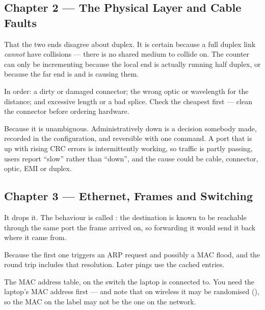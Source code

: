 \subsection*{Chapter 2 --- The Physical Layer and Cable Faults}
\begin{tightnum}
  \item That the two ends disagree about duplex. It is certain because a full
        duplex link \emph{cannot} have collisions --- there is no shared medium to
        collide on. The counter can only be incrementing because the local end is
        actually running half duplex, or because the far end is and is causing
        them.
  \item In order: a dirty or damaged connector; the wrong optic or wavelength for
        the distance; and excessive length or a bad splice. Check the cheapest
        first --- clean the connector before ordering hardware.
  \item Because it is unambiguous. Administratively down is a decision somebody
        made, recorded in the configuration, and reversible with one command. A
        port that is up with rising CRC errors is intermittently working, so
        traffic is partly passing, users report ``slow'' rather than ``down'',
        and the cause could be cable, connector, optic, EMI or duplex.
\end{tightnum}

\subsection*{Chapter 3 --- Ethernet, Frames and Switching}
\begin{tightnum}
  \item It drops it. The behaviour is called : the destination is
        known to be reachable through the same port the frame arrived on, so
        forwarding it would send it back where it came from.
  \item Because the first one triggers an ARP request and possibly a MAC flood,
        and the round trip includes that resolution. Later pings use the cached
        entries.
  \item The MAC address table, on the switch the laptop is connected to. You need
        the laptop's MAC address first --- and note that on wireless it may be
        randomised (), so the MAC on the label may not be the
        one on the network.
\end{tightnum}

